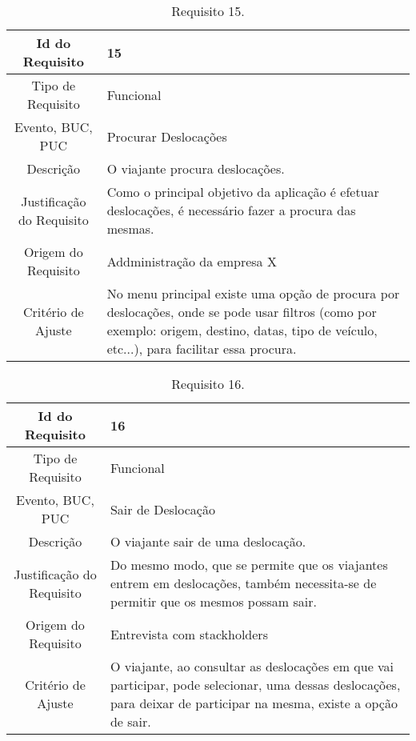 \begin{table}[H]
\begin{center}
  \begin{tabularx}{\textwidth}{ | c | X | }
    \hline
    Id do Requisito & 15  \\
    
    \hline
    Tipo de Requisito & Funcional \\
    
    \hline
    Evento, BUC, PUC &  Procurar Deslocações\\
    
    \hline
    Descrição & O viajante procura deslocações.\\
    
    \hline
    Justificação do Requisito & Como o principal objetivo da aplicação é efetuar deslocações, é necessário fazer a procura das mesmas. \\
    
    \hline
    Origem do Requisito & Addministração da empresa X\\
    
    \hline
    Critério de Ajuste & No menu principal existe uma opção de procura por deslocações, onde se pode usar filtros (como por exemplo: origem, destino, datas, tipo de veículo, etc...), para facilitar essa procura.  \\
    
    \hline
  \end{tabularx}
  \caption{Requisito 15.} \label{tab:r3}
\end{center}
\end{table}

\begin{table}[H]
\begin{center}
  \begin{tabularx}{\textwidth}{ | c | X | }
    \hline
    Id do Requisito & 16  \\
    
    \hline
    Tipo de Requisito & Funcional \\
    
    \hline
    Evento, BUC, PUC &  Sair de Deslocação\\
    
    \hline
    Descrição & O viajante sair de uma deslocação.\\
    
    \hline
    Justificação do Requisito & Do mesmo modo, que se permite que os viajantes entrem em deslocações, também necessita-se de permitir que os mesmos possam sair. \\
    
    \hline
    Origem do Requisito & Entrevista com stackholders\\
    
    \hline
    Critério de Ajuste & O viajante, ao consultar as deslocações em que vai participar, pode selecionar, uma dessas deslocações, para deixar de participar na mesma, existe a opção de sair.  \\
    
    \hline
  \end{tabularx}
  \caption{Requisito 16.} \label{tab:r3}
\end{center}
\end{table}

